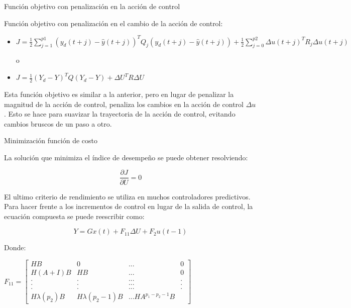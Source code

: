 \documentclass{beamer}
\begin{document}
\begin{frame}{Función objetivo con penalización en la acción de control }
\begin{justify}

Función objetivo con penalización en el cambio de la acción de control:


\vspace{0.3cm}
\begin{itemize}
    \item \( J = \frac{1}{2} \sum_{j=1}^{p1} \left( y_d(t + j) - \hat{y}(t + j) \right)^T Q_j \left( y_d(t + j) - \hat{y}(t + j) \right) + \frac{1}{2} 
    \sum_{j=0}^{p2} \Delta u(t + j)^T R_j \Delta u(t + j) \)

    \vspace{0.3cm}
    o
    
    \vspace{0.3cm}
    \item \( J = \frac{1}{2} (Y_d - Y)^T Q (Y_d - Y) + \Delta U^T R \Delta U \)
\end{itemize}

\vspace{0.3cm}
Esta función objetivo es similar a la anterior, pero en lugar de penalizar la magnitud de la acción de control, penaliza los cambios en la acción de control \( \Delta u \). Esto se hace para suavizar la trayectoria de la acción de control, evitando cambios bruscos de un paso a otro.


\end{justify}
\end{frame}



\begin{frame}{Minimización función de costo}
\begin{justify}

\footnotesize{
La solución que minimiza el índice de desempeño se puede obtener resolviendo:


$$\frac{\partial J}{\partial U}=0$$

El ultimo criterio de rendimiento se utiliza en muchos controladores predictivos. Para hacer frente a los incrementos de control en lugar de la salida de control, la ecuación compuesta se puede reescribir como:

$$Y=Gx(t)+F_{11}\Delta U + F_2 u(t-1) $$

Donde:

\vspace{0.2cm}
\centering 
$F_{11}=
\begin{bmatrix}
    HB & 0 & ... & 0 \\
    H(A+I)B & HB & ... & 0\\
    . & . & ... & . \\
    . & . & ... & . \\
    . & . & ... & . \\
    H\lambda(p_2)B & H\lambda(p_2-1)B & ... HA^{p_1-p_2-1}B
\end{bmatrix}$

}

\end{justify}
\end{frame}
\end{document}
